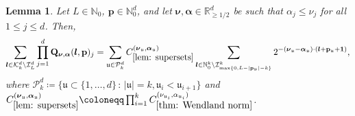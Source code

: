 \documentclass[pdflatex,sn-mathphys-num]{sn-jnl}%
\theoremstyle{thmstyleone}%
\newtheorem{lemma}{Lemma}%
\theoremstyle{thmstyletwo}%
\theoremstyle{thmstylethree}%
\begin{document}
\begin{lemma}\label{lem: supersets}
    Let \(L\in\mathbb{N}_{0}\), \(\mathbf{p}\in\mathbb{N}_0^d\), and let \(\boldsymbol{\nu},\boldsymbol{\alpha}\in\mathbb{R}^d_{\geq1/2}\) be such that \(\alpha_j\leq\nu_j\) for all \(1\leq j \leq d\). Then,
    \begin{align}
        \sum_{\boldsymbol{l}\in\mathcal{K}^d_k\setminus \mathcal{I}^d_L}\prod_{j=1}^d{\mathbf{Q}_{\boldsymbol{\nu},\boldsymbol{\alpha}}(\boldsymbol{l},\mathbf{p})_j} = \sum_{\mathfrak{u}\in\mathcal{P}^d_k}C_{\ref{lem: supersets}}^{(\boldsymbol{\nu}_{\mathfrak{u}},\boldsymbol{\alpha}_{\mathfrak{u}})}\sum_{\boldsymbol{l}\in\mathbb{N}_0^k\setminus\mathcal{I}_{\max\{0,L-|\mathbf{p}_{\mathfrak{u}}|-k\}}^k}2^{-(\boldsymbol{\nu}_{\mathfrak{u}}-\boldsymbol{\alpha}_{\mathfrak{u}})\cdot(\boldsymbol{l}+\mathbf{p}_{\mathfrak{u}}+\mathbf{1})},\nonumber
    \end{align}
    where \(\mathcal{P}^d_k\coloneqq\{\mathfrak{u}\subset\{1,\dots,d\}\,:\,|\mathfrak{u}|=k, \mathfrak{u}_i<\mathfrak{u}_{i+1}\}\) and \(C_{\ref{lem: supersets}}^{(\boldsymbol{\nu}_{\mathfrak{u}},\boldsymbol{\alpha}_{\mathfrak{u}})}\coloneqq\prod_{i=1}^kC_{\ref{thm: Wendland norm}}^{(\nu_{\mathfrak{u}_i},\alpha_{\mathfrak{u}_i})}\).
\end{lemma}
\end{document}
